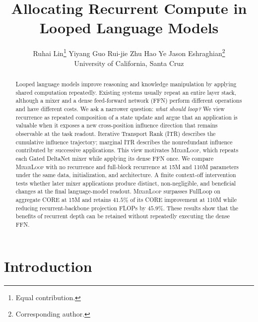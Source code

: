 \documentclass{article}
\title{Allocating Recurrent Compute in Looped Language Models}
\author{
  Ruhai Lin\thanks{Equal contribution.} \quad
  Yiyang Guo\footnotemark[1] \quad
  Rui-jie Zhu \quad
  Hao Ye \quad
  Jason Eshraghian\thanks{Corresponding author.}\\
  University of California, Santa Cruz
}
\date{}
\newcommand{\method}{\textsc{MixerLoop}}
\begin{document}
\raggedbottom

\maketitle

\begin{abstract}
    Looped language models improve reasoning and knowledge manipulation by applying shared computation repeatedly. Existing systems usually repeat an entire layer stack, although a mixer and a dense feed-forward network (FFN) perform different operations and have different costs. We ask a narrower question: \emph{what should loop?} We view recurrence as repeated composition of a state update and argue that an application is valuable when it exposes a new cross-position influence direction that remains observable at the task readout. Iterative Transport Rank (ITR) describes the cumulative influence trajectory; marginal ITR describes the nonredundant influence contributed by successive applications. This view motivates \method{}, which repeats each Gated DeltaNet mixer while applying its dense FFN once. We compare \method{} with no recurrence and full-block recurrence at 15M and 110M parameters under the same data, initialization, and architecture. A finite context-off intervention tests whether later mixer applications produce distinct, non-negligible, and beneficial changes at the final language-model readout. \method{} surpasses FullLoop on aggregate CORE at 15M and retains $41.5\%$ of its CORE improvement at 110M while reducing recurrent-backbone projection FLOPs by $45.9\%$. These results show that the benefits of recurrent depth can be retained without repeatedly executing the dense FFN.
\end{abstract}


\section{Introduction}
\end{document}

